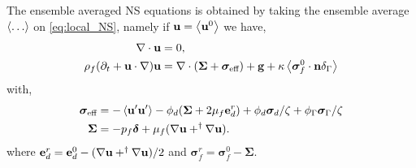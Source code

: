 \documentclass[12pt]{My_preprint}
\begin{document}
The ensemble averaged NS equations is obtained by taking the ensemble average $\left<\ldots\right>$ on \ref{eq:local_NS}, namely if $\textbf{u} = \left<\textbf{u}^0\right>$ we have, 
\begin{align}
    \mathbf{\nabla}\cdot \textbf{u} &= 0, \\
    \rho_f (\partial_t + \textbf{u} \cdot \mathbf{\nabla}) \textbf{u}
    &= 
    \mathbf{\nabla}\cdot (\bm\Sigma + \bm\sigma_\text{eff})
    + \textbf{g}
    + \kappa \left<\bm\sigma_f^0  \cdot \textbf{n} \delta_\Gamma\right>
\end{align}
with, 
\begin{align}
    \bm\sigma_\text{eff}
    &= -\left<\textbf{u}'\textbf{u}'\right>
    - \phi_d (\bm\Sigma + 2\mu_f \textbf{e}_d^r)
    + \phi_d \bm\sigma_d /\zeta
    + \phi_\Gamma \bm\sigma_\Gamma /\zeta\\
    \bm\Sigma 
    &= -p_f \bm\delta
    + \mu_f (\mathbf{\nabla} \textbf{u} + ^\dagger \mathbf{\nabla} \textbf{u}). 
\end{align}
where $\textbf{e}_d^r = \textbf{e}_d^0 - (\mathbf{\nabla} \textbf{u} + ^\dagger \mathbf{\nabla} \textbf{u})/2$ and $\bm\sigma_f^r = \bm\sigma_f^0 - \bm\Sigma$. 
\end{document}
